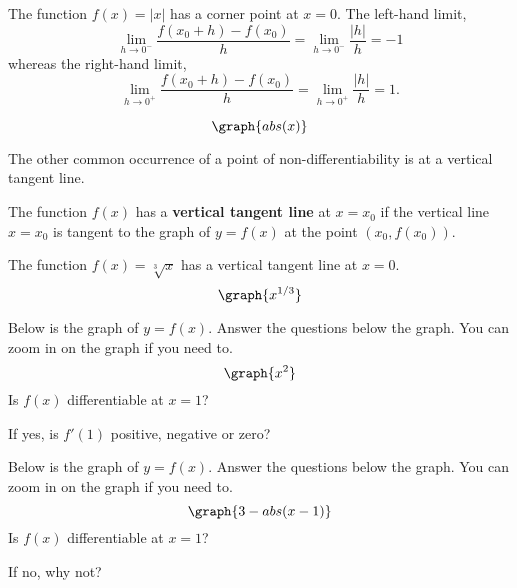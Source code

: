 \documentclass[handout]{ximera}
\begin{document}
\begin{example}
The function $f(x) = |x|$ has a corner point at $x = 0$.
The left-hand limit, 
\[
\lim_{h\to 0^-} \frac{f(x_0 +h)-f(x_0)}{h} = \lim_{h\to 0^-} \frac{|h|}{h} = -1
\]
whereas the right-hand limit,
\[
\lim_{h\to 0^+} \frac{f(x_0 +h)-f(x_0)}{h} = \lim_{h\to 0^+} \frac{|h|}{h} = 1.
\]

\[
\graph{abs(x)}
\]
\end{example}

The other common occurrence of a point of non-differentiability is at a vertical tangent line.


\begin{definition} The function $f(x)$ has a \textbf{vertical tangent line} at $x = x_0$ if
the vertical line $x = x_0$ is tangent to the graph of $y = f(x)$ at the point $(x_0, f(x_0))$.
\end{definition}

\begin{example}
The function $f(x) = \sqrt[3] x$ has a vertical tangent line at $x = 0$.
\[
\graph{x^{1/3}}
\]
\end{example}


\begin{problem}
Below is the graph of $y = f(x)$.  Answer the questions below the graph.  You can zoom in on the graph if you need to.
\[
\graph{x^2}
\]
Is $f(x)$ differentiable at $x = 1$?
\begin{multipleChoice}
\end{multipleChoice}
If yes, is $f'(1)$ positive, negative or zero?
\begin{multipleChoice}
\end{multipleChoice}
\end{problem}




\begin{problem}
Below is the graph of $y = f(x)$.  Answer the questions below the graph.  You can zoom in on the graph if you need to.
\[
\graph{3-abs(x-1)}
\]
Is $f(x)$ differentiable at $x = 1$?
\begin{multipleChoice}
\end{multipleChoice}
If no, why not?
\begin{multipleChoice}
\end{multipleChoice}
\end{problem}
\end{document}
